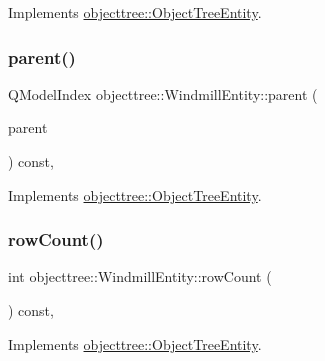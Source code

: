Implements \mbox{\hyperlink{classobjecttree_1_1_object_tree_entity_a9ccaab3b27e65b1ed8b22f00c57a1082}{objecttree\+::\+Object\+Tree\+Entity}}.

\mbox{\label{classobjecttree_1_1_windmill_entity_afb4d86e4b6a73c8d5e834a16e6186f51}} 
\subsubsection{\texorpdfstring{parent()}{parent()}}
{\footnotesize\ttfamily Q\+Model\+Index objecttree\+::\+Windmill\+Entity\+::parent (\begin{DoxyParamCaption}\item[{const Q\+Model\+Index \&}]{parent }\end{DoxyParamCaption}) const\hspace{0.3cm}{\ttfamily [override]}, {\ttfamily [virtual]}}



Implements \mbox{\hyperlink{classobjecttree_1_1_object_tree_entity_a2d1b13c056476f87637aacd7e99e7305}{objecttree\+::\+Object\+Tree\+Entity}}.

\mbox{\label{classobjecttree_1_1_windmill_entity_ad28bdc7cebee4f903a8cb2e5c84f70c5}} 
\subsubsection{\texorpdfstring{rowCount()}{rowCount()}}
{\footnotesize\ttfamily int objecttree\+::\+Windmill\+Entity\+::row\+Count (\begin{DoxyParamCaption}{ }\end{DoxyParamCaption}) const\hspace{0.3cm}{\ttfamily [override]}, {\ttfamily [virtual]}}



Implements \mbox{\hyperlink{classobjecttree_1_1_object_tree_entity_a82c626bb28c55dcfce11cf7ec3368588}{objecttree\+::\+Object\+Tree\+Entity}}.

\mbox{\label{classobjecttree_1_1_windmill_entity_abdd0b07f1aafee26616f46b9c0ce120f}} 
